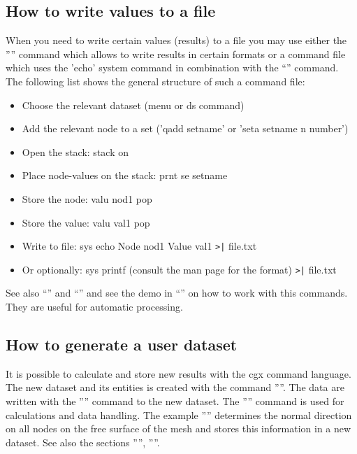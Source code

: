\documentclass{article}
\begin{document}
\begin{appendix}
\subsection{\label{How to write values to a file}How to write values to a file}
When you need to write certain values (results) to a file you may use either the '''' command which allows to write results in certain formats or a command file which uses the 'echo' system command in combination with the ``'' command. The following list shows the general structure of such a command file:
\begin{itemize}
\item Choose the relevant dataset (menu or ds command)
\item Add the relevant node to a set ('qadd setname' or 'seta setname n number') 
\item Open the stack: stack on
\item Place node-values on the stack: prnt se setname
\item Store the node: valu nod1 pop 
\item Store the value: valu val1 pop 
\item Write to file: sys echo Node nod1 Value val1 \verb_>|_ file.txt
\item Or optionally: sys printf (consult the man page for the format) \verb_>|_ file.txt
\end{itemize}
See also ``'' and ``'' and see the demo in ``'' on how to work with this commands. They are useful for automatic processing.

\subsection{\label{How to generate a user dataset}How to generate a user dataset}
It is possible to calculate and store new results with the cgx command language. The new dataset and its entities is created with the command ''''. The data are written with the '''' command to the new dataset. The '''' command is used for calculations and data handling. The example '''' determines the normal direction on all nodes on the free surface of the mesh and stores this information in a new dataset. See also the sections '''', ''''.


\end{appendix}
\end{document}
